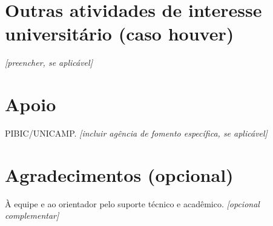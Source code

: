 \documentclass[12pt,a4paper]{article}
\begin{document}
\section{Outras atividades de interesse universitário (caso houver)}
\textit{[preencher, se aplicável]}

\section{Apoio}
PIBIC/UNICAMP. \textit{[incluir agência de fomento específica, se aplicável]}

\section{Agradecimentos (opcional)}
À equipe e ao orientador pelo suporte técnico e acadêmico. \textit{[opcional complementar]}
\end{document}
